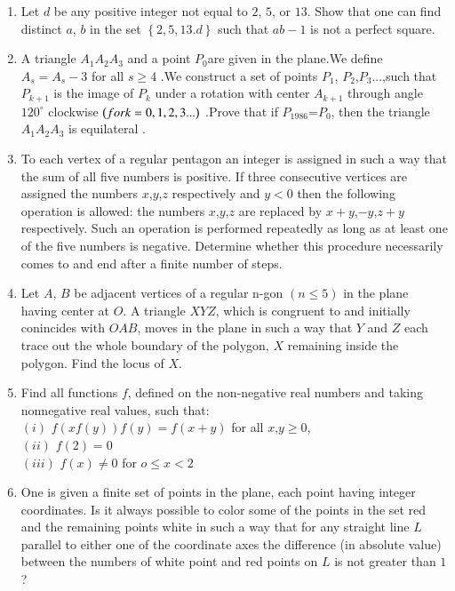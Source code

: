 \documentclass[12pt,-letter paper]{article}
\providecommand{\cbrak}[1]{\ensuremath{\left\{#1\right\}}}
\providecommand{\brak}[1]{\ensuremath{\left(#1\right)}}
\begin{document}
\begin{enumerate}

	\item  Let $d$ be any positive integer not equal to $2$, $5$, or $13$. Show that one can find distinct $a$, $b$ in the set $\cbrak{2, 5, 13. d}$ such that $ab-1$ is not a perfect square.
	\item A triangle $A_1A_2A_3$ and a point $P_0 $are given in the plane.We define $A_s=A_s-3$ for all $s\geq4$ .We construct a set of points $P_1$, $P_2$,$P_3$...,such that $P_{k+1}$ is the image of $P_k$ under a rotation with center $A_{k+1}$ through angle $120^\circ$ clockwise $\brak{for \space k=0,1,2,3...}$ .Prove that if $P_{1986}$=$P_0$, then the triangle $A_1A_2A_3$ is equilateral .
	\item  To each vertex of a regular pentagon an integer is assigned in such a way that the sum of all five numbers is positive. If three consecutive vertices are assigned the numbers $x$,$y$,$z$ respectively and $y<0$ then the following operation is allowed: the numbers $x$,$y$,$z$ are replaced by $x+y$,$-y$,$z+y$ respectively. Such an operation is performed repeatedly as long as at least one of the five numbers is negative. Determine whether this procedure necessarily comes to and end after a finite number of steps.
	\item Let $A$, $B$ be adjacent vertices of a regular n-gon \brak{n\leq5} in the plane having center at $O$. A triangle $XYZ$, which is congruent to and initially conincides with $OAB$, moves in the plane in such a way that $Y$ and $Z$ each trace out the whole boundary of the polygon, $X$ remaining inside the polygon. Find the locus of $X$.
	\item Find all functions $f$, defined on the non-negative real numbers and taking nonnegative real values, such that: \\ 
		\brak{i} $f\brak{xf\brak{y}}f\brak{y}=f\brak{x+y}$ for all $x$,$y\geq0$, \\
		\brak{ii} $f\brak{2}=0$\\
		\brak{iii} $f\brak{x}\neq0$ for $o\leq x <2$
	\item One is given a finite set of points in the plane, each point having integer coordinates. Is it always possible to color some of the points in the set red and the remaining points white in such a way that for any straight line $L$ parallel to either one of the coordinate axes the difference (in absolute value) between the numbers of white point and red points on $L$ is not greater than $1$?

\end{enumerate}
\end{document}
